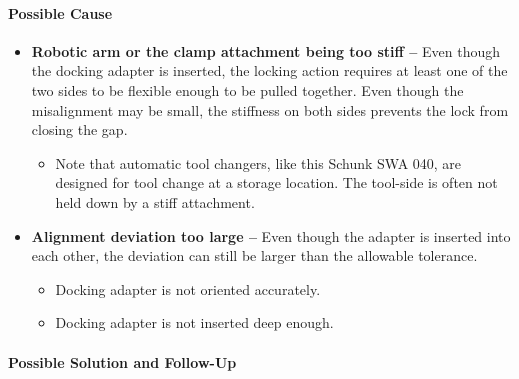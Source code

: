 \paragraph{Possible Cause}

\begin{itemize}
	\item \textbf{Robotic arm or the clamp attachment being too stiff --} Even though the docking adapter is inserted, the locking action requires at least one of the two sides to be flexible enough to be pulled together. Even though the misalignment may be small, the stiffness on both sides prevents the lock from closing the gap.

\begin{itemize}
	\item Note that automatic tool changers, like this Schunk SWA 040, are designed for tool change at a storage location. The tool-side is often not held down by a stiff attachment.

\end{itemize}
	\item \textbf{Alignment deviation too large --} Even though the adapter is inserted into each other, the deviation can still be larger than the allowable tolerance.

\begin{itemize}
	\item Docking adapter is not oriented accurately.

	\item Docking adapter is not inserted deep enough.

\end{itemize}
\end{itemize}
\paragraph{Possible Solution and Follow-Up}

